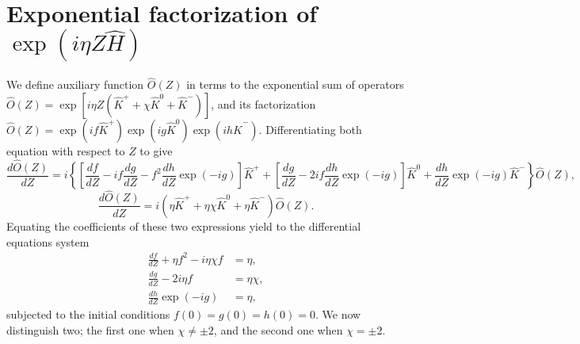 \documentclass[12pt]{article}
\numberwithin{equation}{section}
\begin{document}
\section{Exponential factorization of  $\exp\left( i \eta Z \hat{H} \right)$ }
We define auxiliary function $\hat{O}(Z)$ in terms to the exponential sum of operators $\hat{O}(Z)=\exp \left[i \eta  Z \left(\hat{K}^+ +\chi \hat{K}^0  +\hat{K}^-\right)\right]$, and its factorization $\hat{O}(Z)=\exp\left(i f \hat{K}^+ \right) \exp\left(i g \hat{K}^0 \right) \exp\left(i h \hat{K}^- \right)$. Differentiating  both equation with respect to $Z$ to give
\begin{equation} \label{ap01}
\frac{d\hat{O}(Z)}{dZ}=
i \left\lbrace  \left[ \frac{df}{dZ}   -i f \frac{dg}{dZ} - f^2 \frac{dh}{dZ} \exp\left(-i g \right)\right]  \hat{K}^+
+ \left[ \frac{dg}{dZ}-2 i f \frac{dh}{dZ} \exp\left(-i g \right) \right] \hat{K}^0
+  \frac{dh}{dZ} \exp\left(-i g \right)\hat{K}^- 
\right\rbrace \hat{O}(Z),
\end{equation}
\begin{equation}
\frac{d\hat{O}(Z)}{dZ}=i    \left(\eta\hat{K}^+ +\eta\chi \hat{K}^0  +\eta\hat{K}^-\right)\hat{O}(Z).
\end{equation}
Equating the coefficients of these two expressions yield to the differential equations system
\begin{subequations}\label{ap02}
\begin{align}
\frac{df}{dZ}+ \eta f^2 -i \eta\chi f &=\eta,
\\ 
\frac{dg}{dZ}-2 i \eta f &=\eta\chi,
\\
\frac{dh}{dZ} \exp\left(-i g \right)&=\eta,
\end{align}
\end{subequations} 
subjected to the initial conditions $f(0)=g(0)=h(0)=0$. We now distinguish two; the first one when  $\chi\neq \pm 2$, and the second one when $\chi=\pm 2$.
\end{document}
